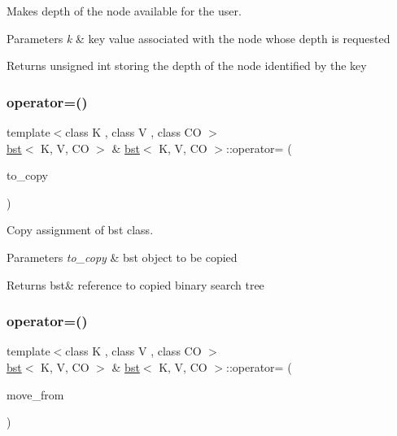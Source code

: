 Makes depth of the node available for the user. 


\begin{DoxyParams}{Parameters}
{\em k} & key value associated with the node whose depth is requested \\
\hline
\end{DoxyParams}
\begin{DoxyReturn}{Returns}
unsigned int storing the depth of the node identified by the key 
\end{DoxyReturn}
\mbox{\label{classbst_ad65d0d6908d7ec4ac231d601774708cf}} 
\subsubsection{\texorpdfstring{operator=()}{operator=()}\hspace{0.1cm}{\footnotesize\ttfamily [1/2]}}
{\footnotesize\ttfamily template$<$class K , class V , class CO $>$ \\
\hyperlink{classbst}{bst}$<$ K, V, CO $>$ \& \hyperlink{classbst}{bst}$<$ K, V, CO $>$\+::operator= (\begin{DoxyParamCaption}\item[{const \hyperlink{classbst}{bst}$<$ K, V, CO $>$ \&}]{to\+\_\+copy }\end{DoxyParamCaption})}



Copy assignment of bst class. 


\begin{DoxyParams}{Parameters}
{\em to\+\_\+copy} & bst object to be copied \\
\hline
\end{DoxyParams}
\begin{DoxyReturn}{Returns}
bst\& reference to copied binary search tree 
\end{DoxyReturn}
\mbox{\label{classbst_a9f6886149564f901cae5664a44a05892}} 
\subsubsection{\texorpdfstring{operator=()}{operator=()}\hspace{0.1cm}{\footnotesize\ttfamily [2/2]}}
{\footnotesize\ttfamily template$<$class K , class V , class CO $>$ \\
\hyperlink{classbst}{bst}$<$ K, V, CO $>$ \& \hyperlink{classbst}{bst}$<$ K, V, CO $>$\+::operator= (\begin{DoxyParamCaption}\item[{\hyperlink{classbst}{bst}$<$ K, V, CO $>$ \&\&}]{move\+\_\+from }\end{DoxyParamCaption})}



